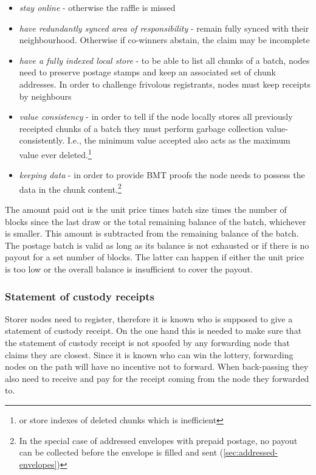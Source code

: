 \begin{itemize}
\item  \emph{stay online} - otherwise the raffle is missed
\item \emph{have redundantly synced area of responsibility} - remain fully synced with their neighbourhood. Otherwise if co-winners abstain, the claim may be incomplete
\item \emph{have a fully indexed local store} - to be able to list all chunks of a batch, nodes need to preserve postage stamps and keep an associated set of chunk addresses. In order to challenge frivolous registrants, nodes must keep receipts by neighbours
\item \emph{value consistency} - in order to tell if the node locally stores all previously receipted chunks of a batch they must perform garbage collection value-consistently. I.e., the minimum value accepted also acts as the maximum value ever deleted.\footnote{or store indexes of deleted chunks which is inefficient}
\item \emph{keeping data} - in order to provide BMT proofs the node needs to possess the data in the chunk content.\footnote{In the special case of addressed envelopes with prepaid postage, no payout can be collected before the envelope is filled and sent (\ref{sec:addressed-envelopes})}
\end{itemize}

The amount paid out is the unit price times batch size times the number of blocks since the last draw or the total remaining balance of the batch, whichever is smaller. This amount is subtracted from the remaining balance of the batch.  The postage batch is valid as long as its balance is not exhausted  or if there is no payout for a set number of blocks. The latter can happen if either the unit price is too low or the overall balance is insufficient to cover the payout. 
 
\subsubsection{Statement of custody receipts}

Storer nodes need to register, therefore it is known who is supposed to give a statement of custody receipt. 
On the one hand this is needed to make sure that the statement of custody receipt is not spoofed by any forwarding node that claims they are closest. Since it is known who can win the lottery, forwarding nodes on the path will have no incentive not to forward. When back-passing they also need to receive and pay for the receipt coming from the node they forwarded to. 

